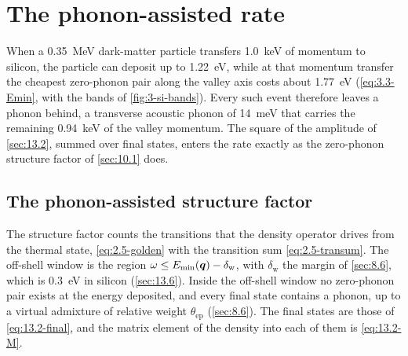\section{The phonon-assisted rate}\label{sec:13.3}

When a \SI{0.35}{MeV} dark-matter particle transfers \SI{1.0}{keV} of momentum to silicon, the particle can deposit up to \SI{1.22}{eV}, while at that momentum transfer the cheapest zero-phonon pair along the valley axis costs about \SI{1.77}{eV} (\cref{eq:3.3-Emin}, with the bands of \cref{fig:3-si-bands}). Every such event therefore leaves a phonon behind, a transverse acoustic phonon of \SI{14}{meV} that carries the remaining \SI{0.94}{keV} of the valley momentum. The square of the amplitude of \cref{sec:13.2}, summed over final states, enters the rate exactly as the zero-phonon structure factor of \cref{sec:10.1} does.

\subsection{The phonon-assisted structure factor}

The structure factor counts the transitions that the density operator drives from the thermal state, \cref{eq:2.5-golden} with the transition sum \cref{eq:2.5-transum}. The off-shell window is the region $\omega \le E_{\mathrm{min}}(\bm{q}) - \delta_{\mathrm{w}}$, with $\delta_{\mathrm{w}}$ the margin of \cref{sec:8.6}, which is \SI{0.3}{eV} in silicon (\cref{sec:13.6}). Inside the off-shell window no zero-phonon pair exists at the energy deposited, and every final state contains a phonon, up to a virtual admixture of relative weight $\theta_{\mathrm{ep}}$ (\cref{sec:8.6}). The final states are those of \cref{eq:13.2-final}, and the matrix element of the density into each of them is \cref{eq:13.2-M}.

